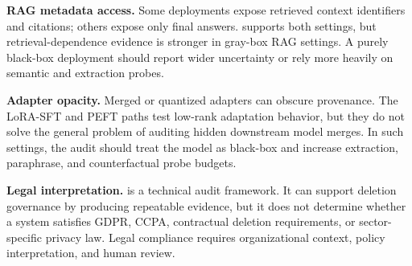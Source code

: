 \textbf{RAG metadata access.}
Some deployments expose retrieved context identifiers and citations; others expose only final answers. \method{} supports both settings, but retrieval-dependence evidence is stronger in gray-box RAG settings. A purely black-box deployment should report wider uncertainty or rely more heavily on semantic and extraction probes.

\textbf{Adapter opacity.}
Merged or quantized adapters can obscure provenance. The LoRA-SFT and PEFT paths test low-rank adaptation behavior, but they do not solve the general problem of auditing hidden downstream model merges. In such settings, the audit should treat the model as black-box and increase extraction, paraphrase, and counterfactual probe budgets.

\textbf{Legal interpretation.}
\method{} is a technical audit framework. It can support deletion governance by producing repeatable evidence, but it does not determine whether a system satisfies GDPR, CCPA, contractual deletion requirements, or sector-specific privacy law. Legal compliance requires organizational context, policy interpretation, and human review.
